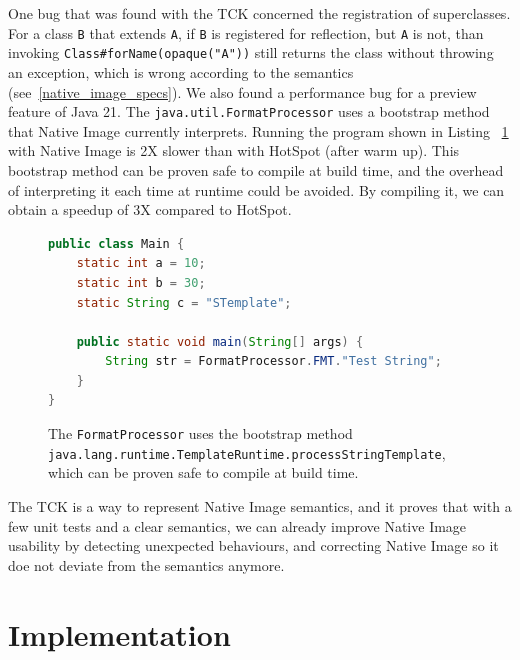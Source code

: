 One bug that was found with the TCK concerned the registration of superclasses. For a class \verb|B| that extends \verb|A|, if \verb|B| is registered for reflection, but \verb|A| is not, than invoking \verb|Class#forName(opaque("A"))| still returns the class without throwing an exception, which is wrong according to the semantics (see~\ref{native_image_specs}). 
We also found a performance bug for a preview feature of Java 21. The \verb|java.util.FormatProcessor| uses a bootstrap method that Native Image currently interprets. Running the program shown in Listing ~\ref{fig:format_processor} with Native Image is 2X slower than with HotSpot (after warm up). This bootstrap method can be proven safe to compile at build time, and the overhead of interpreting it each time at runtime could be avoided. By compiling it, we can obtain a speedup of 3X compared to HotSpot.

\begin{figure}[ht]
    \centering
\begin{lstlisting}[language=Java]
public class Main {
    static int a = 10;
    static int b = 30;
    static String c = "STemplate";

    public static void main(String[] args) {
        String str = FormatProcessor.FMT."Test String";
    }
}
\end{lstlisting}
    \caption{The \texttt{FormatProcessor} uses the bootstrap method \texttt{java.lang.runtime.TemplateRuntime.processStringTemplate}, which can be proven safe to compile at build time. }
    \label{fig:format_processor}
\end{figure}

The TCK is a way to represent Native Image semantics, and it proves that with a few unit tests and a clear semantics, we can already improve Native Image usability by detecting unexpected behaviours, and correcting Native Image so it doe not deviate from the semantics anymore.


\chapter{Implementation}

